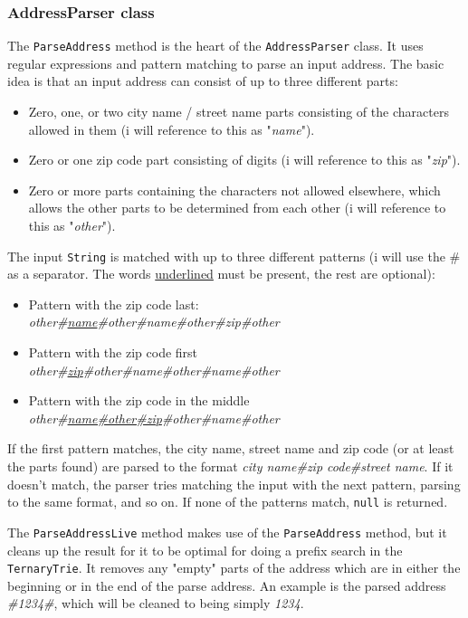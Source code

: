 \subsubsection{AddressParser class}
The \texttt{ParseAddress} method is the heart of the \texttt{AddressParser} class. It uses regular expressions and pattern matching to parse an input address. The basic idea is that an input address can consist of up to three different parts:
\begin{itemize}
	\item Zero, one, or two city name / street name parts consisting of the characters allowed in them (i will reference to this as "\textit{name}").
	\item Zero or one zip code part consisting of digits (i will reference to this as "\textit{zip}").
	\item Zero or more parts containing the characters not allowed elsewhere, which allows the other parts to be determined from each other (i will reference to this as "\textit{other}").
\end{itemize}
The input \texttt{String} is matched with up to three different patterns (i will use the \# as a separator. The words \underline{underlined} must be present, the rest are optional):
\begin{itemize}
	\item Pattern with the zip code last: \\
		\textit{other\#\underline{name}\#other\#name\#other\#zip\#other}
	\item Pattern with the zip code first \\
	\textit{other\#\underline{zip}\#other\#name\#other\#name\#other}
	\item Pattern with the zip code in the middle \\
	\textit{other\#\underline{name\#other\#zip}\#other\#name\#other}
\end{itemize}
If the first pattern matches, the city name, street name and zip code (or at least the parts found) are parsed to the format \textit{city name\#zip code\#street name}. If it doesn't match, the parser tries matching the input with the next pattern, parsing to the same format, and so on. If none of the patterns match, \texttt{null} is returned.

The \texttt{ParseAddressLive} method makes use of the \texttt{ParseAddress} method, but it cleans up the result for it to be optimal for doing a prefix search in the \texttt{TernaryTrie}. It removes any "empty" parts of the address which are in either the beginning or in the end of the parse address. An example is the parsed address \textit{\#1234\#}, which will be cleaned to being simply \textit{1234}.

